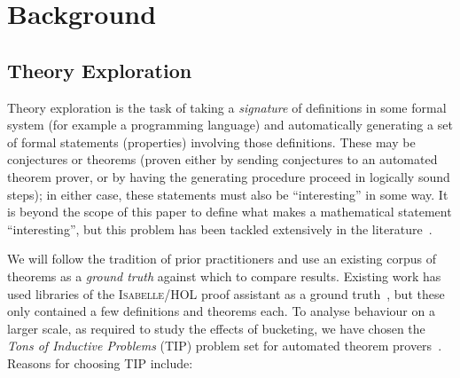 \section{Background}
\label{sec:background}

\subsection{Theory Exploration}
\label{sec:theoryexploration}

Theory exploration is the task of taking a \emph{signature} of definitions in
some formal system (for example a programming language) and automatically
generating a set of formal statements (properties) involving those
definitions. These may be conjectures or theorems (proven either by sending
conjectures to an automated theorem prover, or by having the generating
procedure proceed in logically sound steps); in either case, these statements
must also be ``interesting'' in some way. It is beyond the scope of this paper
to define what makes a mathematical statement ``interesting'', but this problem
has been tackled extensively in the literature~\cite{colton2000notion}.

We will follow the tradition of prior practitioners and use an existing
corpus of theorems as a \emph{ground truth} against which to compare results.
Existing work has used libraries of the \textsc{Isabelle/HOL} proof assistant as
a ground
truth~\cite{Montano-Rivas.McCasland.Dixon.ea:2012,johansson2009isacosy,claessen2013automating},
but these only contained a few definitions and theorems each. To analyse
behaviour on a larger scale, as required to study the effects of bucketing, we
have chosen the \emph{Tons of Inductive Problems} (TIP) problem set for
automated theorem provers~\cite{claessen2015tip}.  Reasons for choosing TIP
include:

